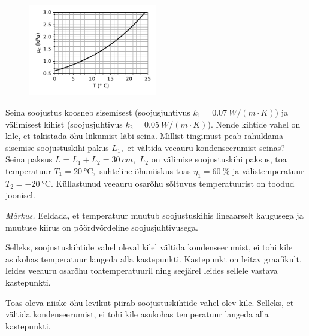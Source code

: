 
\begin{figure}
\vspace{-30pt}
\begin{center}
\includegraphics[width=0.5\textwidth]{2018-v3g-05-kullastunud-aur}
\par\end{center} 
\end{figure}

Seina soojustus koosneb sisemisest (soojusjuhtivus $k_{1}=\SI{0.07}{W/\left(m\cdot K\right)}$)
ja välimisest kihist (soojusjuhtivus $k_{2}=\SI{0.05}{W/\left(m\cdot K\right)}$).
Nende kihtide vahel on kile, et takistada õhu liikumist läbi seina.
Millist tingimust peab rahuldama sisemise soojustuskihi pakus $L_{1},$
et vältida veeauru kondenseerumist seinas? Seina paksus $L=L_{1}+L_{2}=\SI{30}{cm},$
$L_{2}$ on välimise soojustuskihi paksus, toa temperatuur $T_{1}=\SI{20}{\degreeCelsius},$
suhteline õhuniiskus toas $\eta_{1}=\SI{60}{\percent}$ ja välistemperatuur
$T_{2}=\SI{-20}{\degreeCelsius}.$ Küllastunud veeauru osarõhu sõltuvus
temperatuurist on toodud joonisel.

\emph{Märkus.} Eeldada, et temperatuur muutub soojustuskihis lineaarselt
kaugusega ja muutuse kiirus on pöördvõrdeline soojusjuhtivusega. 

\hint
Selleks, soojustuskihtide vahel oleval kilel vältida kondenseerumist, ei tohi kile asukohas temperatuur
langeda alla kastepunkti. Kastepunkt on leitav graafikult, leides veeauru osarõhu toatemperatuuril ning seejärel leides sellele vastava kastepunkti.

\solu
Toas oleva niiske õhu levikut piirab soojustuskihtide vahel olev kile.
Selleks, et vältida kondenseerumist, ei tohi kile asukohas temperatuur
langeda alla kastepunkti. 

